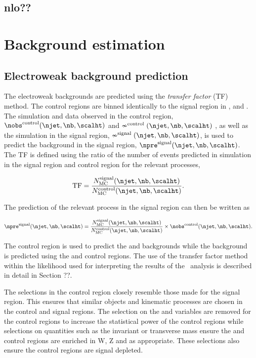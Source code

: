 \subsection{nlo??}
\section{Background estimation}
\subsection{Electroweak background prediction}
The electroweak backgrounds are predicted using the \emph{transfer factor} (TF)
method. The control regions are binned identically
to the signal region in \scalht, \nj and \nb. The simulation and data observed in the control region,
$\nobs^{\rm control}(\njet,\nb,\scalht)$ and $\nsim^{\rm control}(\njet,\nb,\scalht)$ 
, as well as the simulation in the signal region, $\nsim^{\rm signal}(\njet,\nb,\scalht)$, 
is used to predict the background in the signal region, $\npre^{\rm signal}(\njet,\nb,\scalht)$. 
The TF is defined using the ratio of the number of events predicted in 
simulation in the signal region and control region for the relevant processes,

\begin{equation}
  \label{equ:tf-ratio}
  {\rm TF} = \frac{N_{\rm MC}^{\rm signal}(\njet,\nb,\scalht)}{N_{\rm
      MC}^{\rm control}(\njet,\nb,\scalht)}.
\end{equation}

The prediction of the relevant process in the signal region can then be written as

\begin{equation}
  \label{equ:pred-method}
  \npre^{\rm signal}(\njet,\nb,\scalht) = \frac{N_{\rm MC}^{\rm
      signal}(\njet,\nb,\scalht)}{N_{\rm MC}^{\rm
      control}(\njet,\nb,\scalht)} \times \nobs^{\rm
    control}(\njet,\nb,\scalht).
\end{equation}

The \mj control region is used to predict the \wj and \ttbar backgrounds while the
\znunu background is predicted using the \mmj and \gj control regions. The use of 
the transfer factor method within the likelihood used for interpreting the results of the
\alphat~analysis is described in detail in Section ??.

The selections in the control region closely resemble those made for
the signal region. This ensures that similar objects and kinematic processes
are chosen in the control and signal regions. The selection on the \alphat and
\bdphi variables are removed for the control regions to increase the statistical 
power of the control regions while selections on quantities such as the invariant
or transverse mass ensure the \mj and \mmj control regions are enriched in
W, Z and \ttbar as appropriate. These selections also ensure the control regions
are signal depleted.

